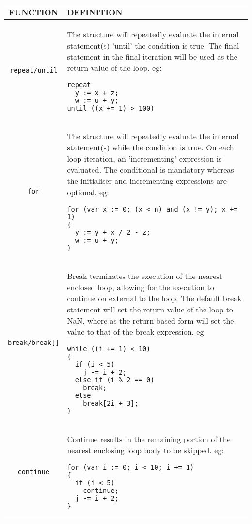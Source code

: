 \begin{tabular}{|c|p{}|}
\hline
FUNCTION& DEFINITION\\
  \hline
\verb'repeat/until'& The structure will repeatedly evaluate the internal
statement(s) 'until' the condition is true. The final
statement in the final iteration will be used as the 
return value of the loop.                            
eg:
\begin{verbatim}
repeat                                               
  y := x + z;                                        
  w := u + y;                                        
until ((x += 1) > 100)                               
\end{verbatim}
\\
\verb'for'& The structure will repeatedly evaluate the internal    
statement(s) while the condition is true. On each loop
iteration, an 'incrementing' expression is evaluated. 
The conditional is mandatory whereas the initialiser  
and incrementing expressions are optional.            
eg:                                                   
\begin{verbatim}
for (var x := 0; (x < n) and (x != y); x += 1)        
{                                                     
  y := y + x / 2 - z;                                 
  w := u + y;                                         
}            
\end{verbatim}
\\
\verb'break/break[]'& Break terminates the execution of the nearest enclosed 
loop, allowing for the execution to continue on external
to the loop. The default break statement will set the   
return value of the loop to NaN, where as the return    
based form will set the value to that of the break      
expression.                                             
eg:
\begin{verbatim}
while ((i += 1) < 10)                                   
{                                                       
  if (i < 5)                                            
    j -= i + 2;                                         
  else if (i % 2 == 0)                                  
    break;                                              
  else                                                  
    break[2i + 3];                                      
}            
\end{verbatim}
\\
\verb'continue'& Continue results in the remaining portion of the nearest
enclosing loop body to be skipped.
eg:
\begin{verbatim}
for (var i := 0; i < 10; i += 1)  
{                                 
  if (i < 5)                      
    continue;                     
  j -= i + 2;                     
}            
\end{verbatim}
  \\
  \hline
\end{tabular}

